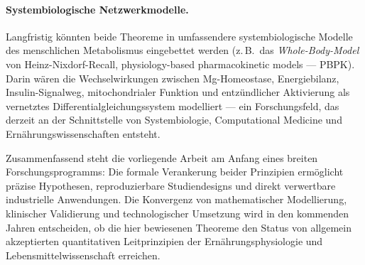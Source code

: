 ﻿\documentclass[12pt,a4paper]{article}
\theoremstyle{plain}
\theoremstyle{definition}
\theoremstyle{remark}
\begin{document}
\paragraph{Systembiologische Netzwerkmodelle.}
Langfristig könnten beide Theoreme in umfassendere
systembiologische Modelle des menschlichen Metabolismus eingebettet werden
(z.\,B.\ das \textit{Whole-Body-Model} von Heinz-Nixdorf-Recall,
physiology-based pharmacokinetic models --- PBPK). Darin wären die
Wechselwirkungen zwischen Mg-Homeostase, Energiebilanz, Insulin-Signalweg,
mitochondrialer Funktion und entzündlicher Aktivierung als vernetztes
Differentialgleichungssystem modelliert --- ein Forschungsfeld, das
derzeit an der Schnittstelle von Systembiologie, Computational Medicine
und Ernährungswissenschaften entsteht.

\bigskip
\noindent
Zusammenfassend steht die vorliegende Arbeit am Anfang eines breiten
Forschungsprogramms: Die formale Verankerung beider Prinzipien ermöglicht
präzise Hypothesen, reproduzierbare Studiendesigns und direkt verwertbare
industrielle Anwendungen. Die Konvergenz von mathematischer Modellierung,
klinischer Validierung und technologischer Umsetzung wird in den kommenden
Jahren entscheiden, ob die hier bewiesenen Theoreme den Status von
allgemein akzeptierten quantitativen Leitprinzipien der
Ernährungsphysiologie und Lebensmittelwissenschaft erreichen.
\end{document}
